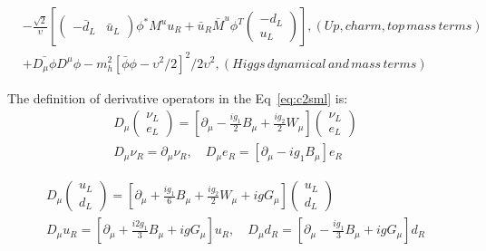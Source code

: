 \begin{equation}
\begin{alignedat}{2}
      & -\frac{\sqrt{2}}{\upsilon}[\begin{pmatrix} -\bar{d}_{L} & \bar{u}_{L} \end{pmatrix}\phi^{*} M^{u}u_{R} + \bar{u}_{R}\bar{M}^{u}\phi^{T}\begin{pmatrix} -d_{L} \\ u_{L} \end{pmatrix}], (Up, charm, top \, mass \, terms) \\
      & +\bar{D_{\mu}\phi}D^{\mu}\phi - m_{h}^{2}[\bar{\phi}\phi-\upsilon^{2}/2]^{2}/2\upsilon^{2}, (Higgs \, dynamical \, and \, mass \, terms)
 \label{eq:c2sml}
 \end{alignedat}
\end{equation}

The definition of derivative operators in the Eq~\ref{eq:c2sml} is:
\begin{equation}
 \begin{aligned}
  D_{\mu}\begin{pmatrix} \nu_{L} \\ e_{L} \end{pmatrix} = [\partial_{\mu}-\frac{ig_{1}}{2}B_{\mu}+\frac{ig_{2}}{2}W_{\mu}]\begin{pmatrix} \nu_{L} \\ e_{L} \end{pmatrix} \\
  D_{\mu}\nu_{R} = \partial_{\mu}\nu_{R},\quad D_{\mu}e_{R} = [\partial_{\mu}-ig_{1}B_{\mu}]e_{R}
 \end{aligned}
 \label{eq:c2smldl}
\end{equation}

\begin{equation}
 \begin{aligned}
  D_{\mu}\begin{pmatrix} u_{L} \\ d_{L} \end{pmatrix} = [\partial_{\mu}+\frac{ig_{1}}{6}B_{\mu}+\frac{ig_{2}}{2}W_{\mu}+igG_{\mu}]\begin{pmatrix} u_{L} \\ d_{L} \end{pmatrix} \\
  D_{\mu}u_{R} = [\partial_{\mu}+\frac{i2g_{1}}{3}B_{\mu}+igG_{\mu}]u_{R},\quad D_{\mu}d_{R} = [\partial_{\mu}-\frac{ig_{1}}{3}B_{\mu}+igG_{\mu}]d_{R}
 \end{aligned}
 \label{eq:c2smldq}
\end{equation}

